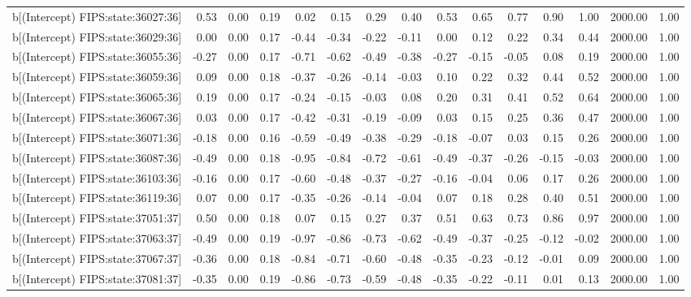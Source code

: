 \begin{table}[ht]
\begin{tabular}{rrrrrrrrrrrrrrr}
  b[(Intercept) FIPS:state:36027:36] & 0.53 & 0.00 & 0.19 & 0.02 & 0.15 & 0.29 & 0.40 & 0.53 & 0.65 & 0.77 & 0.90 & 1.00 & 2000.00 & 1.00 \\ 
  b[(Intercept) FIPS:state:36029:36] & 0.00 & 0.00 & 0.17 & -0.44 & -0.34 & -0.22 & -0.11 & 0.00 & 0.12 & 0.22 & 0.34 & 0.44 & 2000.00 & 1.00 \\ 
  b[(Intercept) FIPS:state:36055:36] & -0.27 & 0.00 & 0.17 & -0.71 & -0.62 & -0.49 & -0.38 & -0.27 & -0.15 & -0.05 & 0.08 & 0.19 & 2000.00 & 1.00 \\ 
  b[(Intercept) FIPS:state:36059:36] & 0.09 & 0.00 & 0.18 & -0.37 & -0.26 & -0.14 & -0.03 & 0.10 & 0.22 & 0.32 & 0.44 & 0.52 & 2000.00 & 1.00 \\ 
  b[(Intercept) FIPS:state:36065:36] & 0.19 & 0.00 & 0.17 & -0.24 & -0.15 & -0.03 & 0.08 & 0.20 & 0.31 & 0.41 & 0.52 & 0.64 & 2000.00 & 1.00 \\ 
  b[(Intercept) FIPS:state:36067:36] & 0.03 & 0.00 & 0.17 & -0.42 & -0.31 & -0.19 & -0.09 & 0.03 & 0.15 & 0.25 & 0.36 & 0.47 & 2000.00 & 1.00 \\ 
  b[(Intercept) FIPS:state:36071:36] & -0.18 & 0.00 & 0.16 & -0.59 & -0.49 & -0.38 & -0.29 & -0.18 & -0.07 & 0.03 & 0.15 & 0.26 & 2000.00 & 1.00 \\ 
  b[(Intercept) FIPS:state:36087:36] & -0.49 & 0.00 & 0.18 & -0.95 & -0.84 & -0.72 & -0.61 & -0.49 & -0.37 & -0.26 & -0.15 & -0.03 & 2000.00 & 1.00 \\ 
  b[(Intercept) FIPS:state:36103:36] & -0.16 & 0.00 & 0.17 & -0.60 & -0.48 & -0.37 & -0.27 & -0.16 & -0.04 & 0.06 & 0.17 & 0.26 & 2000.00 & 1.00 \\ 
  b[(Intercept) FIPS:state:36119:36] & 0.07 & 0.00 & 0.17 & -0.35 & -0.26 & -0.14 & -0.04 & 0.07 & 0.18 & 0.28 & 0.40 & 0.51 & 2000.00 & 1.00 \\ 
  b[(Intercept) FIPS:state:37051:37] & 0.50 & 0.00 & 0.18 & 0.07 & 0.15 & 0.27 & 0.37 & 0.51 & 0.63 & 0.73 & 0.86 & 0.97 & 2000.00 & 1.00 \\ 
  b[(Intercept) FIPS:state:37063:37] & -0.49 & 0.00 & 0.19 & -0.97 & -0.86 & -0.73 & -0.62 & -0.49 & -0.37 & -0.25 & -0.12 & -0.02 & 2000.00 & 1.00 \\ 
  b[(Intercept) FIPS:state:37067:37] & -0.36 & 0.00 & 0.18 & -0.84 & -0.71 & -0.60 & -0.48 & -0.35 & -0.23 & -0.12 & -0.01 & 0.09 & 2000.00 & 1.00 \\ 
  b[(Intercept) FIPS:state:37081:37] & -0.35 & 0.00 & 0.19 & -0.86 & -0.73 & -0.59 & -0.48 & -0.35 & -0.22 & -0.11 & 0.01 & 0.13 & 2000.00 & 1.00 \\ 

\end{tabular}
\end{table}
